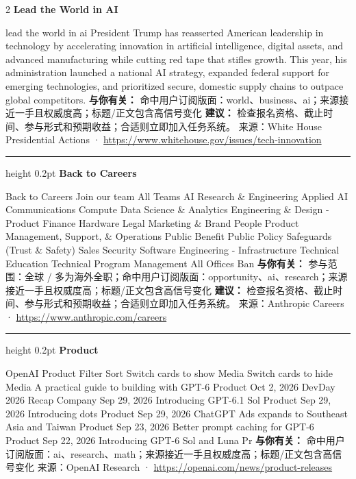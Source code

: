 \documentclass[10.5pt]{ctexart}
\begin{document}
\begin{multicols}{2}
{\large\bfseries Lead the World in AI}\par
lead the world in ai President Trump has reasserted American leadership in technology by accelerating innovation in artificial intelligence, digital assets, and advanced manufacturing while cutting red tape that stifles growth. This year, his administration launched a national AI strategy, expanded federal support for emerging technologies, and prioritized secure, domestic supply chains to outpace global competitors.
\textbf{与你有关：} 命中用户订阅版面：world、business、ai；来源接近一手且权威度高；标题/正文包含高信号变化
\textbf{建议：} 检查报名资格、截止时间、参与形式和预期收益；合适则立即加入任务系统。
{\footnotesize\color{ormuted} 来源：White House Presidential Actions · \url{https://www.whitehouse.gov/issues/tech-innovation}}
\vspace{2mm}
\hrule height 0.2pt
\vspace{2mm}
{\large\bfseries Back to Careers}\par
Back to Careers Join our team All Teams AI Research \& Engineering Applied AI Communications Compute Data Science \& Analytics Engineering \& Design - Product Finance Hardware Legal Marketing \& Brand People Product Management, Support, \& Operations Public Benefit Public Policy Safeguards (Trust \& Safety) Sales Security Software Engineering - Infrastructure Technical Education Technical Program Management All Offices Ban
\textbf{与你有关：} 参与范围：全球 / 多为海外全职；命中用户订阅版面：opportunity、ai、research；来源接近一手且权威度高；标题/正文包含高信号变化
\textbf{建议：} 检查报名资格、截止时间、参与形式和预期收益；合适则立即加入任务系统。
{\footnotesize\color{ormuted} 来源：Anthropic Careers · \url{https://www.anthropic.com/careers}}
\vspace{2mm}
\hrule height 0.2pt
\vspace{2mm}
{\large\bfseries Product}\par
OpenAI Product Filter Sort Switch cards to show Media Switch cards to hide Media A practical guide to building with GPT-6 Product Oct 2, 2026 DevDay 2026 Recap Company Sep 29, 2026 Introducing GPT-6.1 Sol Product Sep 29, 2026 Introducing dots Product Sep 29, 2026 ChatGPT Ads expands to Southeast Asia and Taiwan Product Sep 23, 2026 Better prompt caching for GPT-6 Product Sep 22, 2026 Introducing GPT-6 Sol and Luna Pr
\textbf{与你有关：} 命中用户订阅版面：ai、research、math；来源接近一手且权威度高；标题/正文包含高信号变化
{\footnotesize\color{ormuted} 来源：OpenAI Research · \url{https://openai.com/news/product-releases}}

\end{multicols}
\end{document}
